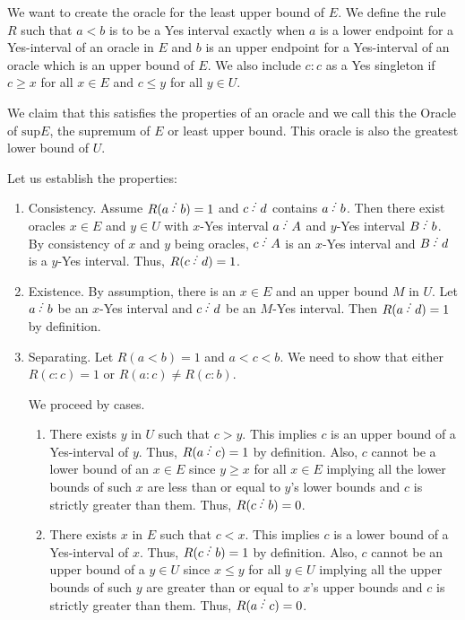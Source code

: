 \documentclass[12pt]{article}
\begin{document}
We want to create the oracle for the least upper bound of $E$. We define the rule $R$ such that $a\lt b$ is to be a Yes interval exactly when $a$ is a lower endpoint for a Yes-interval of an oracle in $E$ and $b$ is an upper endpoint for a Yes-interval of an oracle which is an upper bound of $E$. We also include $c:c$ as a Yes singleton if $c \geq x$ for all $x \in E$ and $c \leq y$ for all $y\in U$.

We claim that this satisfies the properties of an oracle and we call this the Oracle of $\mathrm{sup} E$, the supremum of $E$ or least upper bound. This oracle is also the greatest lower bound of $U$.

Let us establish the properties: 

\begin{enumerate}
    \item Consistency. Assume $R(a \lte b)=1$ and $c\lte d$ contains $a\lte b$. Then there exist oracles $x \in E$ and $y \in U$ with $x$-Yes interval $a\lte A$ and $y$-Yes interval $B\lte b$. By consistency of $x$ and $y$ being oracles, $c\lte A$ is an $x$-Yes interval and $B\lte d$ is a $y$-Yes interval. Thus, $R(c\lte d) = 1$.
    \item Existence. By assumption, there is an $x \in E$ and an upper bound $M$ in $U$. Let $a\lte b$ be an $x$-Yes interval and $c\lte d$ be an $M$-Yes interval. Then $R(a\lte d) = 1$ by definition.  
    \item Separating. Let $R(a\lt b)=1$ and $a < c< b$. We need to show that either $R(c:c)=1$ or $R(a:c) \neq R(c:b)$. 

    We proceed by cases.
    \begin{enumerate}
    \item There exists $y$ in $U$ such that $c > y$. This implies $c$ is an upper bound of a Yes-interval of $y$. Thus, $R(a \lte c) = 1$ by definition. Also, $c$ cannot be a lower bound of an $x \in E$ since $y \geq x$ for all $x \in E$ implying all the lower bounds of such $x$ are less than or equal to $y$'s lower bounds and $c$ is strictly greater than them. Thus, $R(c \lte b) = 0$. 

    \item There exists $x$ in $E$ such that $c < x$.  This implies $c$ is a lower bound of a Yes-interval of $x$. Thus, $R(c \lte b) = 1$ by definition. Also, $c$ cannot be an upper bound of a $y \in U$ since $x \leq y$ for all $y \in U$ implying all the upper bounds of such $y$ are greater than or equal to $x$'s upper bounds and $c$ is strictly greater than them. Thus, $R(a \lte c) = 0$.


\end{enumerate}
\end{enumerate}
\end{document}
